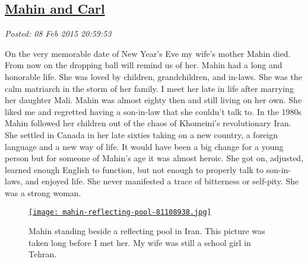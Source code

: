 %

\subsection*{\href{https://bakerjd99.wordpress.com/2015/02/08/mahin-and-carl/}{Mahin and Carl}}


\noindent\emph{Posted: 08 Feb 2015 20:59:53}
\vspace{6pt}

On the very memorable date of New Year's Eve my wife's mother Mahin
died. From now on the dropping ball will remind us of her. Mahin had a
long and honorable life. She was loved by children, grandchildren, and
in-laws. She was the calm matriarch in the storm of her family. I meet
her late in life after marrying her daughter Mali. Mahin was almost
eighty then and still living on her own. She liked me and regretted
having a son-in-law that she couldn't talk to. In the 1980s Mahin
followed her children out of the chaos of Khomeini's revolutionary Iran.
She settled in Canada in her late sixties taking on a new country, a
foreign language and a new way of life. It would have been a big change
for a young person but for someone of Mahin's age it was almost heroic.
She got on, adjusted, learned enough English to function, but not enough
to properly talk to son-in-laws, and enjoyed life. She never manifested
a trace of bitterness or self-pity. She was a strong woman.



\captionsetup[figure]{labelformat=empty}
\begin{SCfigure}
\centering
\href{https://bakerjd99.wordpress.com/2015/02/08/mahin-and-carl/attachment/4933/}{\texttt{[image: mahin-reflecting-pool-81108938.jpg]}}
\caption[Mahin standing beside a reflecting pool in Iran]{Mahin standing beside a reflecting pool in Iran. This picture was taken
long before I met her. My wife was still a school girl in
Tehran.}
\label{fig:4930X0}
\end{SCfigure}



